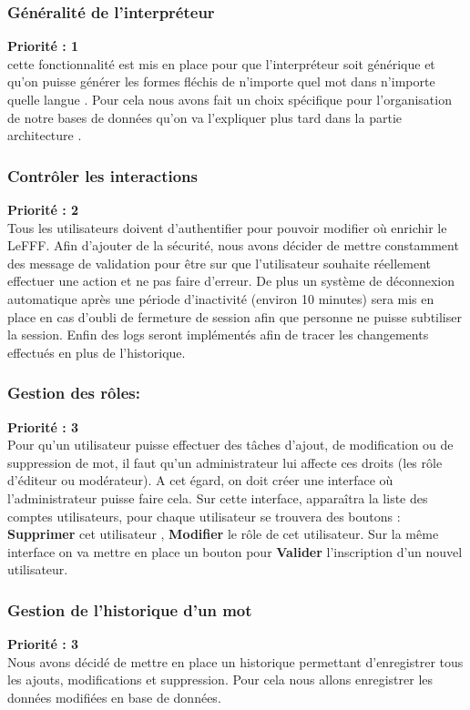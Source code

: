 \documentclass[12pt,a4paper]{article}
\begin{document}
\subsubsection{Généralité de l'interpréteur} \textbf{Priorité : 1}\\ cette fonctionnalité est mis en place pour que l'interpréteur soit générique et qu'on puisse générer les formes fléchis de n'importe quel mot dans n'importe quelle langue . Pour cela nous avons fait un choix spécifique pour l'organisation de notre bases de données qu'on va l'expliquer plus tard dans la partie architecture .

\subsubsection{Contrôler les interactions }
 \textbf{Priorité : 2}
\\ Tous les utilisateurs doivent d'authentifier pour pouvoir modifier où enrichir le LeFFF. Afin d'ajouter de la sécurité, nous avons décider de mettre constamment des message de validation pour être sur que l'utilisateur souhaite réellement effectuer une action et ne pas faire d'erreur.
De plus un système de déconnexion automatique après une période d'inactivité (environ 10 minutes) sera mis en place en cas d'oubli de fermeture de session afin que personne ne puisse subtiliser la session.
Enfin des logs seront implémentés afin de tracer les changements effectués en plus de l'historique.

\subsubsection{Gestion des rôles:}
 \textbf{Priorité : 3} \\
Pour qu'un utilisateur puisse effectuer des tâches d'ajout, de modification ou de suppression de mot, il faut qu'un administrateur lui affecte ces droits (les rôle d'éditeur ou modérateur). A cet égard, on doit créer une interface où l'administrateur puisse faire cela.
Sur cette interface, apparaîtra la liste des comptes utilisateurs, pour chaque utilisateur se trouvera des boutons  : \textbf{Supprimer} cet utilisateur ,\textbf{ Modifier} le rôle de cet utilisateur. 
Sur la même interface on va mettre en place un bouton pour \textbf{Valider} l'inscription d'un nouvel utilisateur.


\subsubsection{Gestion de l'historique d'un mot}
 \textbf{Priorité : 3} \\
Nous avons décidé de mettre en place un historique permettant d'enregistrer tous les ajouts, modifications et suppression. Pour cela nous allons enregistrer les données modifiées en base de données.
\end{document}
